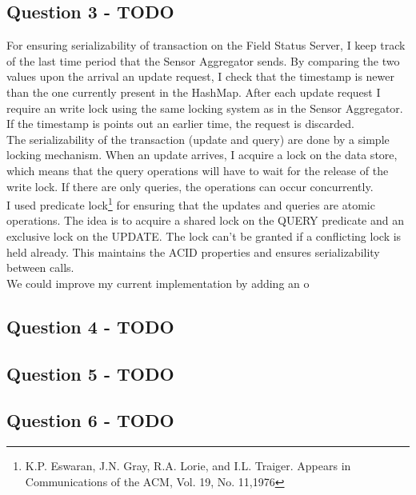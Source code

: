 \documentclass{article}      %
\begin{document}
\subsection* {Question 3 - TODO}

For ensuring serializability of transaction on the Field Status Server, I keep track of the last time period that the Sensor Aggregator sends. By comparing the two values upon the arrival an update request, I check that the timestamp is newer than the one currently present in the HashMap. After each update request I require an write lock using the same locking system as in the Sensor Aggregator. If the timestamp is points out an earlier time, the request is discarded. \\

The serializability of the transaction (update and query) are done by a simple locking mechanism. When an update arrives, I acquire a lock on the data store, which means that the query operations will have to wait for the release of the write lock. If there are only queries, the operations can occur concurrently.\\

I used predicate lock\footnote{K.P. Eswaran, J.N. Gray, R.A. Lorie, and I.L. Traiger.
Appears in Communications of the ACM, Vol. 19, No. 11,1976} for ensuring that the updates and queries are atomic operations.  The idea is to acquire a shared lock on the QUERY predicate and an exclusive lock on the UPDATE. The lock can't be granted if a conflicting lock is held already. This maintains the ACID properties and ensures serializability between calls.\\

We could improve my current implementation by adding an o

\subsection* {Question 4 - TODO}
\subsection* {Question 5 - TODO}
\subsection* {Question 6 - TODO}
\end{document}
